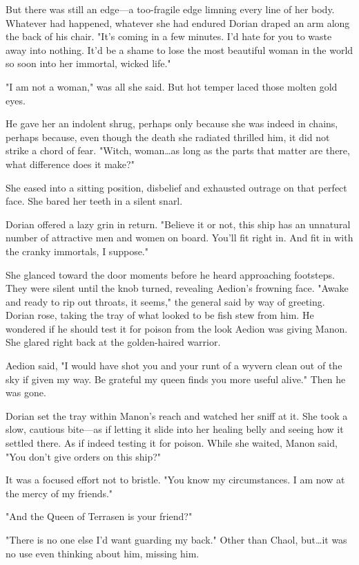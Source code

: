 But there was still an edge---a too-fragile edge limning every line of her body.
Whatever had happened, whatever she had endured 
Dorian draped an arm along the back of his chair.
"It's coming in a few minutes.
I'd hate for you to waste away into nothing.
It'd be a shame to lose the most beautiful woman in the world so soon into her immortal, wicked life."

"I am not a woman," was all she said.
But hot temper laced those molten gold eyes.

He gave her an indolent shrug, perhaps only because she was indeed in chains, perhaps because, even though the death she radiated thrilled him, it did not strike a chord of fear.
"Witch, woman\ldots as long as the parts that matter are there, what difference does it make?"

She eased into a sitting position, disbelief and exhausted outrage on that perfect face.
She bared her teeth in a silent snarl.

Dorian offered a lazy grin in return.
"Believe it or not, this ship has an unnatural number of attractive men and women on board.
You'll fit right in.
And fit in with the cranky immortals, I suppose."

She glanced toward the door moments before he heard approaching footsteps.
They were silent until the knob turned, revealing Aedion's frowning face.
"Awake and ready to rip out throats, it seems," the general said by way of greeting.
Dorian rose, taking the tray of what looked to be fish stew from him.
He wondered if he should test it for poison from the look Aedion was giving Manon.
She glared right back at the golden-haired warrior.

Aedion said, "I would have shot you and your runt of a wyvern clean out of the sky if given my way.
Be grateful my queen finds you more useful alive."
Then he was gone.

Dorian set the tray within Manon's reach and watched her sniff at it.
She took a slow, cautious bite---as if letting it slide into her healing belly and seeing how it settled there.
As if indeed testing it for poison.
While she waited, Manon said, "You don't give orders on this ship?"

It was a focused effort not to bristle.
"You know my circumstances.
I am now at the mercy of my friends."

"And the Queen of Terrasen is your friend?"

"There is no one else I'd want guarding my back."
Other than Chaol, but\ldots it was no use even thinking about him, missing him.

